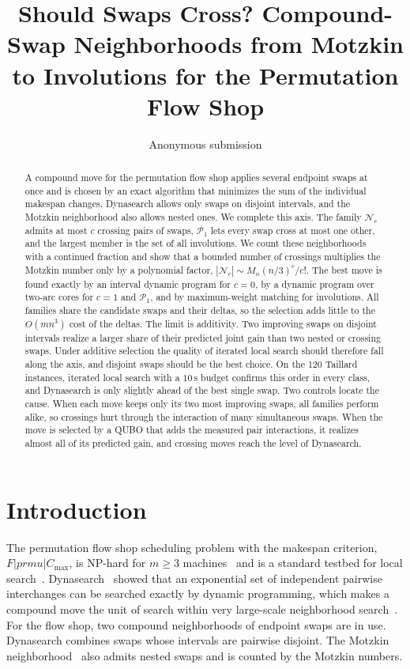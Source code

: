\documentclass{article}
\title{Should Swaps Cross? Compound-Swap Neighborhoods from Motzkin\\
to Involutions for the Permutation Flow Shop}
\author{Anonymous submission}
\newcommand{\N}{\mathcal{N}}
\newcommand{\Pa}{\mathcal{P}}
\begin{document}
\maketitle

\begin{abstract}
A compound move for the permutation flow shop applies several endpoint
swaps at once and is chosen by an exact algorithm that minimizes the sum
of the individual makespan changes. Dynasearch allows only swaps on
disjoint intervals, and the Motzkin neighborhood also allows nested
ones. We complete this axis. The family $\N_c$ admits at most $c$
crossing pairs of swaps, $\Pa_1$ lets every swap cross at most one
other, and the largest member is the set of all involutions. We count
these neighborhoods with a continued fraction and show that a bounded
number of crossings multiplies the Motzkin number only by a polynomial
factor, $|\N_c|\sim M_n (n/3)^c/c!$. The best move is found exactly by
an interval dynamic program for $c=0$, by a dynamic program over
two-arc cores for $c=1$ and $\Pa_1$, and by maximum-weight matching for
involutions. All families share the candidate swaps and their deltas, so
the selection adds little to the $O(mn^3)$ cost of the deltas. The limit
is additivity. Two improving swaps on disjoint intervals realize a
larger share of their predicted joint gain than two nested or crossing
swaps. Under additive selection the quality of iterated local search
should therefore fall along the axis, and disjoint swaps should be the
best choice. On the 120 Taillard instances, iterated local search with
a $10$\,s budget confirms this order in every class, and Dynasearch is
only slightly ahead of the best single swap. Two controls locate the
cause. When each move keeps only its two most improving swaps, all
families perform alike, so crossings hurt through the interaction of
many simultaneous swaps. When the move is selected by a QUBO that adds
the measured pair interactions, it realizes almost all of its predicted
gain, and crossing moves reach the level of Dynasearch.
\end{abstract}

\section{Introduction}

The permutation flow shop scheduling problem with the makespan
criterion, $F|prmu|C_{\max}$, is NP-hard for $m\geq 3$
machines~\cite{garey1976} and is a standard testbed for local
search~\cite{taillard1993,ruiz2007}. Dynasearch~\cite{congram2002}
showed that an exponential set of independent pairwise interchanges can
be searched exactly by dynamic programming, which makes a compound move
the unit of search within very large-scale neighborhood
search~\cite{ahuja2002}. For the flow shop, two compound neighborhoods
of endpoint swaps are in use. Dynasearch combines swaps whose intervals
are pairwise disjoint. The Motzkin neighborhood~\cite{motzkin_own} also
admits nested swaps and is counted by the Motzkin numbers.
\end{document}
